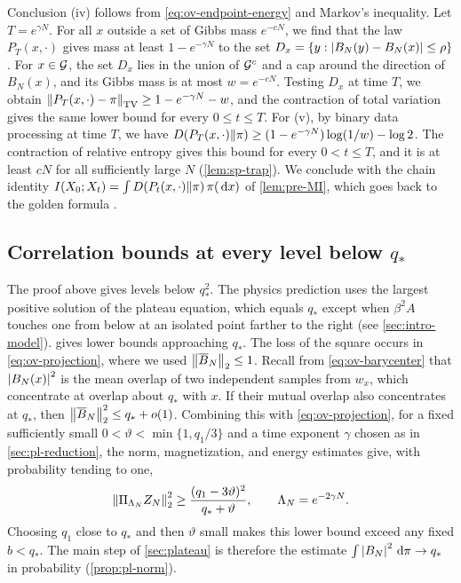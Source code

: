 Conclusion (iv) follows from \eqref{eq:ov-endpoint-energy} and Markov's inequality. Let $T=e^{\gamma N}$. For all $x$ outside a set of Gibbs mass $e^{-cN}$, we find that the law $P_T(x,\cdot)$ gives mass at least $1-e^{-\gamma N}$ to the set $D_x=\{y:\left|B_N(y)-B_N(x)\right|\le\rho\}$. For $x\in\mathcal G$, the set $D_x$ lies in the union of $\mathcal G^c$ and a cap around the direction of $B_N(x)$, and its Gibbs mass is at most $w=e^{-cN}$. Testing $D_x$ at time $T$, we obtain $\left\lVert P_T(x,\cdot)-\pi\right\rVert_{\mathrm{TV}}\ge1-e^{-\gamma N}-w$, and the contraction of total variation gives the same lower bound for every $0\le t\le T$. For (v), by binary data processing at time $T$, we have $D(P_T(x,\cdot)\Vert\pi)\ge(1-e^{-\gamma N})\log(1/w)-\log2$. The contraction of relative entropy gives this bound for every $0<t\le T$, and it is at least $cN$ for all sufficiently large $N$ (\cref{lem:sp-trap}). We conclude with the chain identity $I(X_0;X_t)=\int D(P_t(x,\cdot)\Vert\pi)\,\pi(\,\mathrm d x)$ of \cref{lem:pre-MI}, which goes back to the golden formula \cite[Theorem~4.1]{PolyanskiyWu2025}.

\subsection{Correlation bounds at every level below \texorpdfstring{$q_*$}{q*}}\label{sec:ov-plateau}

The proof above gives levels below $q_*^2$. The physics prediction uses the largest positive solution of the plateau equation, which equals $q_*$ except when $\beta^2A$ touches one from below at an isolated point farther to the right (see \cref{sec:intro-model}).  gives lower bounds approaching $q_*$. The loss of the square occurs in \eqref{eq:ov-projection}, where we used $\left\lVert\overline B_N\right\rVert_2\le1$. Recall from \eqref{eq:ov-barycenter} that $\left|B_N(x)\right|^2$ is the mean overlap of two independent samples from $w_x$, which concentrate at overlap about $q_*$ with $x$. If their mutual overlap also concentrates at $q_*$, then $\left\lVert\overline B_N\right\rVert_2^2\le q_*+o(1)$. Combining this with \eqref{eq:ov-projection}, for a fixed sufficiently small $0<\vartheta<\min\{1,q_1/3\}$ and a time exponent $\gamma$ chosen as in \cref{sec:pl-reduction}, the norm, magnetization, and energy estimates give, with probability tending to one,
\begin{equation}\label{eq:ov-sharper}
\left\lVert\Pi_{\Lambda_N}Z_N\right\rVert_2^2\ge\frac{(q_1-3\vartheta)^2}{q_*+\vartheta},\qquad\Lambda_N=e^{-2\gamma N}.
\end{equation}
Choosing $q_1$ close to $q_*$ and then $\vartheta$ small makes this lower bound exceed any fixed $b<q_*$. The main step of \cref{sec:plateau} is therefore the estimate $\int\left|B_N\right|^2\,\mathrm d\pi\to q_*$ in probability (\cref{prop:pl-norm}).

